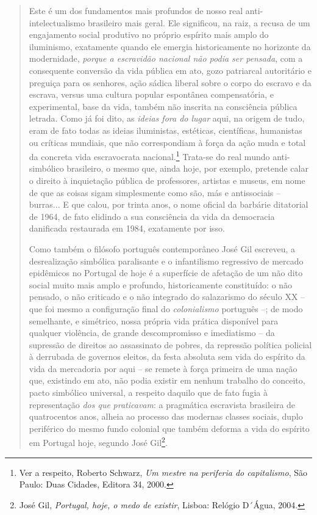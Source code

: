 \begin{quote}
Este é um dos fundamentos mais profundos de nosso real
anti-intelectualismo brasileiro mais geral. Ele significou, na raiz, a
recusa de um engajamento social produtivo no próprio espírito mais amplo
do iluminismo, exatamente quando ele emergia historicamente no horizonte
da modernidade, \emph{porque a escravidão nacional não podia ser
pensada}, com a consequente conversão da vida pública em ato, gozo
patriarcal autoritário e preguiça para os senhores, ação sádica liberal
sobre o corpo do escravo e da escrava, versus uma cultura popular
espontânea compensatória, e experimental, base da vida, também não
inscrita na consciência pública letrada. Como já foi dito, as
\emph{ideias fora do lugar} aqui, na origem de tudo, eram de fato todas
as ideias iluministas, estéticas, científicas, humanistas ou críticas
mundiais, que não correspondiam à força da ação muda e total da concreta
vida escravocrata nacional.\footnote{Ver a respeito, Roberto Schwarz,
  \emph{Um mestre na periferia do capitalismo}, São Paulo: Duas Cidades,
  Editora 34, 2000.} Trata-se do real mundo anti-simbólico brasileiro, o
mesmo que, ainda hoje, por exemplo, pretende calar o direito à
inquietação pública de professores, artistas e museus, em nome de que as
coisas sigam simplesmente como são, más e antissociais -- burras... E
que calou, por trinta anos, o nome oficial da barbárie ditatorial de
1964, de fato elidindo a sua consciência da vida da democracia
danificada restaurada em 1984, exatamente por isso.

Como também o filósofo português contemporâneo José Gil escreveu, a
desrealização simbólica paralisante e o infantilismo regressivo de
mercado epidêmicos no Portugal de hoje é a superfície de afetação de um
não dito social muito mais amplo e profundo, historicamente constituído:
o não pensado, o não criticado e o não integrado do salazarismo do
século XX -- que foi mesmo a configuração final do \emph{colonialismo}
português --; de modo semelhante, e simétrico, nossa própria vida
prática disponível para qualquer violência, de grande descompromisso e
imediatismo -- da supressão de direitos ao assassinato de pobres, da
repressão política policial à derrubada de governos eleitos, da festa
absoluta sem vida do espírito da vida da mercadoria por aqui -- se
remete à força primeira de uma nação que, existindo em ato, não podia
existir em nenhum trabalho do conceito, pacto simbólico universal, a
respeito daquilo que de fato fugia à representação \emph{dos que}
\emph{praticavam}: a pragmática escravista brasileira de quatrocentos
anos, alheia ao processo das modernas classes sociais, duplo periférico
do mesmo fundo colonial que também deforma a vida do espírito em
Portugal hoje, segundo José Gil\footnote{José Gil, \emph{Portugal, hoje,
  o medo de existir}, Lisboa: Relógio D´Água, 2004.}.


\end{quote}
